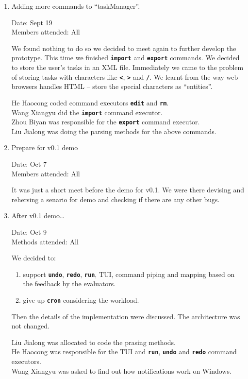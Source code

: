 \documentclass[12pt, a4paper]{article}
\newcommand{\cmdinline}[1]{{\bf \texttt{#1}}}
\begin{document}
\begin{enumerate}
\item Adding more commands to ``taskManager''.

Date: Sept 19\\
Members attended: All

We found nothing to do so we decided to meet again to further develop the prototype. This time we finished \cmdinline{import} and \cmdinline{export} commands. We decided to store the user's tasks in an XML file. Immediately we came to the problem of storing tasks with characters like \cmdinline{<}, \cmdinline{>} and \cmdinline{/}. We learnt from the way web browsers handles HTML -- store the special characters as ``entities''.

He Haocong coded command executors \cmdinline{edit} and \cmdinline{rm}.\\
Wang Xiangyu did the \cmdinline{import} command executor.\\
Zhou Biyan was responsible for the \cmdinline{export} command executor.\\
Liu Jialong was doing the parsing methods for the above commands. %

\item Prepare for v0.1 demo

Date: Oct 7\\
Members attended: All

It was just a short meet before the demo for v0.1. We were there devising and rehersing a senario for demo and checking if there are any other bugs. 

\item After v0.1 demo\ldots

Date: Oct 9\\
Methods attended: All

We decided to:
\begin{enumerate}
\item  support \cmdinline{undo}, \cmdinline{redo}, \cmdinline{run}, TUI, command piping and mapping based on the feedback by the evaluators.
\item  give up \cmdinline{cron} considering the workload.
\end{enumerate}

Then the details of the implementation were discussed. The architecture was not changed.

Liu Jialong was allocated to code the prasing methods.\\
He Haocong was responsible for the TUI and \cmdinline{run}, \cmdinline{undo} and \cmdinline{redo} command executors.\\
Wang Xiangyu was asked to find out how notifications work on Windows.\\


\end{enumerate}
\end{document}
